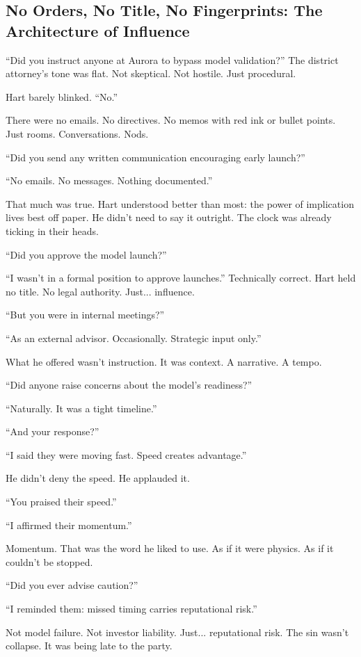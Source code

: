   

\subsection{No Orders, No Title, No Fingerprints: The Architecture of Influence}

“Did you instruct anyone at Aurora to bypass model validation?”
The district attorney's tone was flat. Not skeptical. Not hostile. Just procedural.

Hart barely blinked.
“No.”

There were no emails. No directives. No memos with red ink or bullet points.
Just rooms. Conversations. Nods.

“Did you send any written communication encouraging early launch?”

“No emails. No messages. Nothing documented.”

That much was true. Hart understood better than most: the power of implication lives best off paper.
He didn’t need to say it outright. The clock was already ticking in their heads.

“Did you approve the model launch?”

“I wasn’t in a formal position to approve launches.”
Technically correct. Hart held no title. No legal authority. Just... influence.

“But you were in internal meetings?”

“As an external advisor. Occasionally. Strategic input only.”

What he offered wasn’t instruction. It was context.
A narrative.
A tempo.

“Did anyone raise concerns about the model’s readiness?”

“Naturally. It was a tight timeline.”

“And your response?”

“I said they were moving fast. Speed creates advantage.”

He didn’t deny the speed.
He applauded it.

“You praised their speed.”

“I affirmed their momentum.”

Momentum. That was the word he liked to use. As if it were physics.
As if it couldn’t be stopped.

“Did you ever advise caution?”

“I reminded them: missed timing carries reputational risk.”

Not model failure. Not investor liability.
Just... reputational risk. The sin wasn’t collapse. It was being late to the party.

